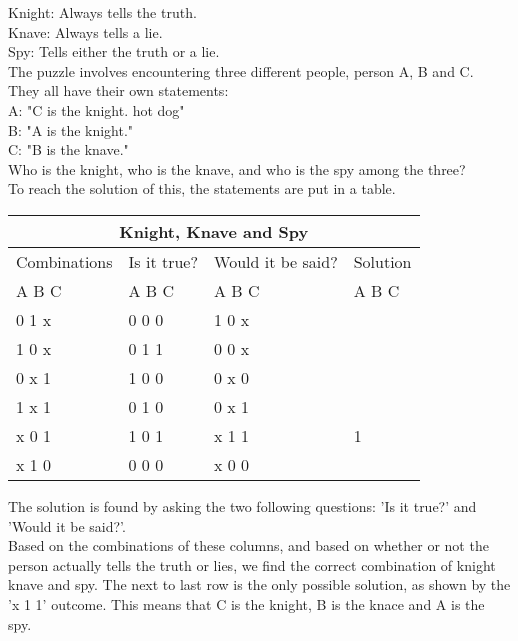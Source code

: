 \documentclass[11pt]{amsart}
\begin{document}
Knight: Always tells the truth.\\
Knave: 	Always tells a lie.\\
Spy: 		Tells either the truth or a lie. \\

The puzzle involves encountering three different people, person A, B and C. \\

They all have their own statements: \\

	A: "C is the knight. hot dog"\\
	B: "A is the knight."\\
	C: "B is the knave." \\

Who is the knight, who is the knave, and who is the spy among the three? \\

To reach the solution of this, the statements are put in a table. \\
\begin{tabular}{ |p{3cm}||p{3cm}|p{3cm}|p{3cm}|  }
 \hline
 \multicolumn{4}{|c|}{Knight, Knave and Spy} \\
 \hline
 Combinations & Is it true? & Would it be said? & Solution  \\ A  B  C   &   A  B  C  &   A  B  C & A  B  C \\
 \hline
	0   1   x  	& 0	0	0   & 1 0 x &  \\
	1   0   x		& 0	1	1  	& 0 0 x &  \\
	0   x   1 	&	1	0	0 	& 0 x 0 &  \\
	1   x   1  	&	0	1	0 	& 0 x 1 &  \\
	x   0   1		& 1	0	1  	& x 1 1 & 1\\
	x   1   0		& 0	0	0  	& x 0 0 &  \\
 \hline
\end{tabular}

The solution is found by asking the two following questions: 'Is it true?' and 'Would it be said?'. \\

Based on the combinations of these columns, and based on whether or not the person actually tells the truth or lies,
we find the correct combination of knight knave and spy. The next to last row is the only possible solution,
as shown by the 'x 1 1' outcome. This means that C is the knight, B is the knace and A is the spy. \\
\end{document}
